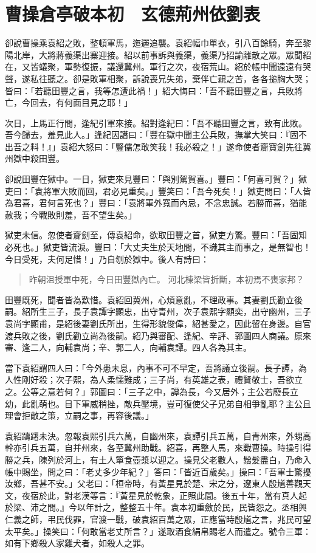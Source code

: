 
\chapter{曹操倉亭破本初　玄德荊州依劉表}

卻說曹操乘袁紹之敗，整頓軍馬，迤邐追襲。袁紹幅巾單衣，引八百餘騎，奔至黎陽北岸，大將蔣義渠出寨迎接。紹以前事訴與義渠，義渠乃招諭離散之眾。眾聞紹在，又皆蟻聚，軍勢復振，議還冀州。軍行之次，夜宿荒山。紹於帳中聞遠遠有哭聲，遂私往聽之。卻是敗軍相聚，訴說喪兄失弟，棄伴亡親之苦，各各搥胸大哭；皆曰：「若聽田豐之言，我等怎遭此禍！」紹大悔曰：「吾不聽田豐之言，兵敗將亡，今回去，有何面目見之耶！」

次日，上馬正行間，逢紀引軍來接。紹對逢紀曰：「吾不聽田豐之言，致有此敗。吾今歸去，羞見此人。」逢紀因譖曰：「豐在獄中聞主公兵敗，撫掌大笑曰：『固不出吾之料！』」袁紹大怒曰：「豎儒怎敢笑我！我必殺之！」遂命使者齎寶劍先往冀州獄中殺田豐。

卻說田豐在獄中。一日，獄吏來見豐曰：「與別駕賀喜。」豐曰：「何喜可賀？」獄吏曰：「袁將軍大敗而回，君必見重矣。」豐笑曰：「吾今死矣！」獄吏問曰：「人皆為君喜，君何言死也？」豐曰：「袁將軍外寬而內忌，不念忠誠。若勝而喜，猶能赦我；今戰敗則羞，吾不望生矣。」

獄吏未信。忽使者齎劍至，傳袁紹命，欲取田豐之首，獄吏方驚。豐曰：「吾固知必死也。」獄吏皆流淚。豐曰：「大丈夫生於天地間，不識其主而事之，是無智也！今日受死，夫何足惜！」乃自刎於獄中。後人有詩曰：

\begin{quote}
昨朝沮授軍中死，今日田豐獄內亡。
河北棟梁皆折斷，本初焉不喪家邦？
\end{quote}

田豐既死，聞者皆為歎惜。袁紹回冀州，心煩意亂，不理政事。其妻劉氏勸立後嗣。紹所生三子，長子袁譚字顯忠，出守青州，次子袁熙字顯奕，出守幽州，三子袁尚字顯甫，是紹後妻劉氏所出，生得形貌俊偉，紹甚愛之，因此留在身邊。自官渡兵敗之後，劉氏勸立尚為後嗣。紹乃與審配、逢紀、辛評、郭圖四人商議。原來審、逢二人，向輔袁尚；辛、郭二人，向輔袁譚。四人各為其主。

當下袁紹謂四人曰：「今外患未息，內事不可不早定，吾將議立後嗣。長子譚，為人性剛好殺；次子熙，為人柔懦難成；三子尚，有英雄之表，禮賢敬士，吾欲立之。公等之意若何？」郭圖曰：「三子之中，譚為長，今又居外；主公若廢長立幼，此亂萌也。目下軍威稍挫，敵兵壓境，豈可復使父子兄弟自相爭亂耶？主公且理會拒敵之策，立嗣之事，再容後議。」

袁紹躊躇未決。忽報袁熙引兵六萬，自幽州來，袁譚引兵五萬，自青州來，外甥高幹亦引兵五萬，自并州來，各至冀州助戰。紹喜，再整人馬，來戰曹操。時操引得勝之兵，陳列於河上，有土人簞食壺漿以迎之。操見父老數人，鬚髮盡白，乃命入帳中賜坐，問之曰：「老丈多少年紀？」答曰：「皆近百歲矣。」操曰：「吾軍士驚擾汝鄉，吾甚不安。」父老曰：「桓帝時，有黃星見於楚、宋之分，遼東人殷馗善觀天文，夜宿於此，對老漢等言：『黃星見於乾象，正照此間。後五十年，當有真人起於梁、沛之間。』今以年計之，整整五十年。袁本初重斂於民，民皆怨之。丞相興仁義之師，弔民伐罪，官渡一戰，破袁紹百萬之眾，正應當時殷馗之言，兆民可望太平矣。」操笑曰：「何敢當老丈所言？」遂取酒食絹帛賜老人而遣之。號令三軍：如有下鄉殺人家雞犬者，如殺人之罪。

